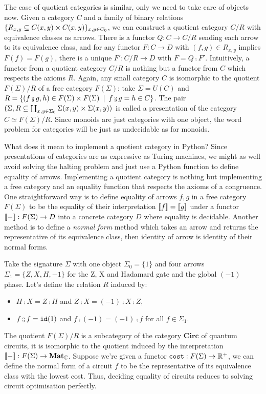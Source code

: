 The case of quotient categories is similar, only we need to take care of objects now.
Given a category $C$ and a family of binary relations $\{ R_{x,y} \subseteq C(x, y) \times C(x, y) \}_{x, y \in C_0}$, we can construct a quotient category $C / R$ with equivalence classes as arrows.
There is a functor $Q : C \to C / R$ sending each arrow to its equivalence class, and for any functor $F : C \to D$ with $(f, g) \in R_{x, y}$ implies $F(f) = F(g)$,
there is a unique $F' : C / R \to D$ with $F = Q \fcmp F'$.
Intuitively, a functor from a quotient category $C / R$ is nothing but a functor from $C$ which respects the axioms $R$.
Again, any small category $C$ is isomorphic to the quotient $F(\Sigma) / R$ of a free category $F(\Sigma)$: take $\Sigma = U(C)$ and $R = \{ (f \fcmp g, h) \in F(\Sigma) \times F(\Sigma) \s \vert \s f \fcmp g = h \in C \}$.
The pair $(\Sigma, R \subseteq \coprod_{x, y \in \Sigma_0} \Sigma(x, y) \times \Sigma(x, y))$ is called a presentation of the category $C \simeq F(\Sigma) / R$.
Since monoids are just categories with one object, the word problem for categories will be just as undecidable as for monoids.

What does it mean to implement a quotient category in Python?
Since presentations of categories are as expressive as Turing machines, we might as well avoid solving the halting problem and just use a Python function to define equality of arrows.
Implementing a quotient category is nothing but implementing a free category and an equality function that respects the axioms of a congruence.
One straightforward way is to define equality of arrows $f, g$ in a free category $F(\Sigma)$ to be the equality of their interpretation $[ \! [ f ] \! ] = [ \! [ g ] \! ]$ under a functor $[ \! [ - ] \! ] : F(\Sigma) \to D$ into a concrete category $D$ where equality is decidable.
Another method is to define a \emph{normal form} method which takes an arrow and returns the representative of its equivalence class, then identity of arrow is identity of their normal forms.

\begin{example} \label{example:1-qubit-presentation}
Take the signature $\Sigma$ with one object $\Sigma_0 = \{ 1 \}$ and four arrows $\Sigma_1  = \{ Z, X, H, -1 \}$ for the Z, X and Hadamard gate and the global $(-1)$ phase.
Let's define the relation $R$ induced by:
\begin{itemize}
    \item $H \fcmp X = Z \fcmp H$ and $Z \fcmp X = (-1) \fcmp X \fcmp Z$,
    \item $f \fcmp f = \id(1)$ and $f \fcmp (-1) = (-1) \fcmp f$ for all $f \in \Sigma_1$.
\end{itemize}
The quotient $F(\Sigma) / R$ is a subcategory of the category $\mathbf{Circ}$ of quantum circuits, it is isomorphic to the quotient induced by the interpretation $[ \! [ - ] \! ] : F(\Sigma) \to \mathbf{Mat}_{\mathbb{C}}$.
Suppose we're given a functor $\mathtt{cost} : F(\Sigma) \to \mathbb{R}^+$, we can define the normal form of a circuit $f$ to be the representative of its equivalence class with the lowest cost.
Thus, deciding equality of circuits reduces to solving circuit optimisation perfectly.
\end{example}

